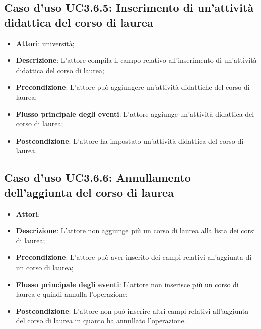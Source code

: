 \subsection{Caso d'uso \texorpdfstring{UC3.6.5}{UC3.6.5}: Inserimento di un'attività didattica del corso di laurea}
\begin{itemize}
\item \textbf{Attori}: università;
\item \textbf{Descrizione}: L'attore compila il campo relativo all'inserimento di un'attività didattica del corso di laurea;

\item \textbf{Precondizione}: L'attore può aggiungere un'attività didattiche del corso di laurea;

\item \textbf{Flusso principale degli eventi}: L'attore aggiunge un'attività didattica del corso di laurea;

\item \textbf{Postcondizione}: L'attore ha impostato un'attività didattica del corso di laurea.

\end{itemize}
\subsection{Caso d'uso \texorpdfstring{UC3.6.6}{UC3.6.6}: Annullamento dell'aggiunta del corso di laurea}
\begin{itemize}
\item \textbf{Attori}: 
\item \textbf{Descrizione}: L'attore non aggiunge più un corso di laurea alla lista dei corsi di laurea;

\item \textbf{Precondizione}: L'attore può aver inserito dei campi relativi all'aggiunta di un corso di laurea;

\item \textbf{Flusso principale degli eventi}: L'attore non inserisce più un corso di laurea e quindi annulla l'operazione;

\item \textbf{Postcondizione}: L'attore non può inserire altri campi relativi all'aggiunta del corso di laurea in quanto ha annullato l'operazione.

\end{itemize}

